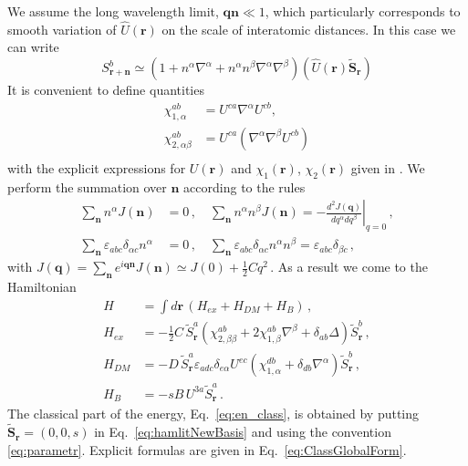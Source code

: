 \documentclass[aps,prb,twocolumn,superscriptaddress,nobalancelastpage]{revtex4-1}
\begin{document}
We assume the long wavelength limit, ${\mathbf{qn}} \ll 1$, which particularly corresponds to smooth variation of $ \hat U\left( \mathbf{r} \right )$ on the scale of interatomic distances. In this case we can write 
\[ S_{\mathbf{r} + \mathbf{n}}^b  \simeq (1+ n^{\alpha} \nabla^{\alpha} + n^{\alpha} n^{\beta} \nabla^{\alpha} \nabla^{\beta} ) (\hat U\left( \mathbf{r} \right ) \tilde {\mathbf{S}}_{\mathbf{r}} ) \]
It is convenient to define quantities
\begin{equation}
\begin{aligned}
  \chi _{1,\alpha }^{ab} & =U^{ca}\nabla ^\alpha U^{cb},    \\
  \chi _{2,\alpha \beta }^{ab} & = U^{ca}\left( \nabla ^\alpha \nabla ^\beta U^{cb} \right)   \\ 
\end{aligned}
\label{eq:chi}
\end{equation}
with the explicit expressions for $U(\mathbf{r})$ and $\chi_1(\mathbf{r})$, $\chi_2(\mathbf{r})$ given in \cite{Aristov2015}. 
We  perform  the summation over $\mathbf{n}$ according to the rules 
\begin{equation*}
\begin{aligned}
  \sum\limits_{\mathbf{n}} n^\alpha J(\mathbf{n}) & = 0  \,, \quad 
  \sum\limits_{\mathbf{n}} n^\alpha n^\beta J(\mathbf{n})  
  =  - \left. \frac{d^2J(\mathbf{q})} {dq^\alpha dq^\beta}\right|_{q = 0}  \,,  \\ 
   \sum\limits_{\mathbf{n}} \varepsilon _{abc}\delta _{\alpha c}n^\alpha   & = 0    \,, \quad
  \sum\limits_{\mathbf{n}} \varepsilon _{abc}\delta _{\alpha c}n^\alpha n^\beta  
   = \varepsilon _{abc}\delta _{\beta c}    \,,
\end{aligned}
\label{eq:integrExch}
\end{equation*}
with $
J(\mathbf{q}) = \sum\limits_{\mathbf{n}} e^{i\mathbf{qn}}J(\mathbf{n})  \simeq J(0) + \tfrac{1}{2}Cq^2 \,.
$
 As a result we come to the Hamiltonian 
\begin{equation}
\begin{aligned}
H  &= \int d\mathbf{r}\, ( H_{ex} + H_{DM} + H_B ) \,, \\ 
H_{ex} &=  - \frac{1}{2}C \, 
 {\tilde S}_{\mathbf{r}}^a \left( \chi _{2,\beta \beta }^{ab} + 2\chi _{1,\beta }^{ab} \nabla ^\beta 
 + \delta _{ab}\Delta  \right)\tilde S_{\mathbf{r}}^b \,, 
\\
H_{DM} &=  - D \, \tilde S_{\mathbf{r}}^a\varepsilon _{adc}\delta _{e\alpha }U^{ec}
\left( \chi _{1,\alpha }^{db} + \delta _{db}\nabla ^\alpha  \right)\tilde S_{\mathbf{r}}^b  \,,
\\
H_ B  &=  - sB \, U^{3a}\tilde S_{\mathbf{r}}^a \,.
\end{aligned} 
\label{eq:hamlitNewBasis}
\end{equation}
The classical part of the energy, Eq.\ \eqref{eq:en_class}, is obtained by putting $\tilde{ \mathbf{S}}_{\mathbf{r}} = (0,0,s)$ in Eq.\ \eqref{eq:hamlitNewBasis} and using the convention \eqref{eq:parametr}. 
Explicit formulas are given in Eq.\ \eqref{eq:ClassGlobalForm}. 
 
\end{document}
